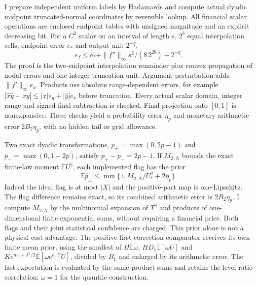 I prepare independent uniform labels by Hadamards and compute actual dyadic
midpoint truncated-normal coordinates by reversible lookup.  All financial
scalar operations are enclosed endpoint tables with unsigned magnitude and
an explicit decreasing bit.  For a $C^2$ scalar on an interval of length $s$,
$2^b$ equal interpolation cells, endpoint error $e_*$ and output unit $2^{-q}$,
\[
 e_f\leq e_*+\|f''\|_\infty s^2/(8\,2^{2b})+2^{-q}.
\]
The proof is the two-endpoint interpolation remainder plus convex propagation
of nodal errors and one integer truncation unit.  Argument perturbation adds
$\|f'\|_\infty e_x$.  Products use absolute range-dependent errors, for
example $|\widehat x\widehat y-xy|\leq |x|e_y+|\widehat y|e_x$ before
truncation.  Every actual scalar domain, integer range and signed final
subtraction is checked.  Final projection onto $[0,1]$ is nonexpansive.
These checks yield a probability error $\eta_p$ and monetary arithmetic error
$2B_2\eta_p$, with no hidden tail or grid allowance.

Two exact dyadic transformations,
$p_+=\max(0,2p-1)$ and $p_-=\max(0,1-2p)$, satisfy $p_+-p_-=2p-1$.
If $M_{2,N}$ bounds the exact finite-law moment $\mathbb E U^2$, each
implemented flag has the prior
\begin{equation}
 \mathbb E\widehat p_\pm\leq
 \min\{1,M_{2,N}/U_*^2+2\eta_p\}.
 \label{eq:core-rare-prior}
\end{equation}
Indeed the ideal flag is at most $|X|$ and the positive-part map is
one-Lipschitz.  The flag difference remains exact, so its combined arithmetic
error is $2B_2\eta_p$.  I compute $M_{2,N}$ by the multinomial expansion of
$T^2$ and products of one-dimensional finite exponential sums, without
requiring a financial price.  Both flags and their joint statistical
confidence are charged.  This prior alone is not a physical-cost advantage.
The positive first-correction comparator receives its own finite mean prior,
using the smallest of $H\mathbb E\omega$, $HD_1\mathbb E[\omega U]$ and
$K e^{m_0+\lambda^2/2}\mathbb E[\omega e^{a\cdot Y}U]$, divided by $B_1$
and enlarged by its arithmetic error.  The last expectation is evaluated by
the same product sums and retains the level-ratio correlation; $\omega=1$
for the quantile construction.

